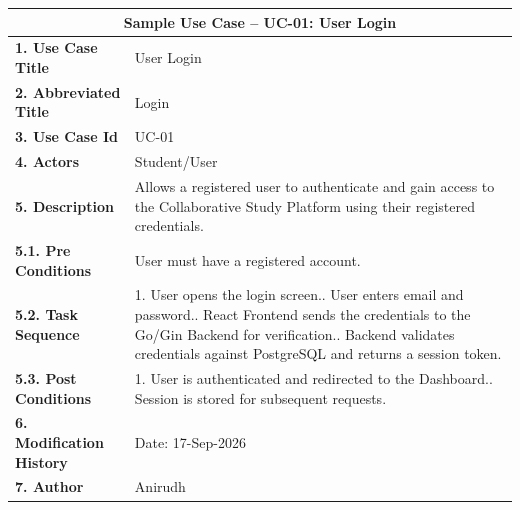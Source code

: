 \documentclass[12pt]{report}
\begin{document}
\begin{center}
\begin{longtable}{|p{4cm}|p{9cm}|}
\hline
\multicolumn{2}{|c|}{\textbf{Sample Use Case -- UC-01: User Login}} \\
\hline
\textbf{1. Use Case Title} & User Login \\
\hline
\textbf{2. Abbreviated Title} & Login \\
\hline
\textbf{3. Use Case Id} & UC-01 \\
\hline
\textbf{4. Actors} & Student/User \\
\hline
\textbf{5. Description} & Allows a registered user to authenticate and gain access to the
Collaborative Study Platform using their registered credentials. \\
\hline
\textbf{5.1. Pre Conditions} & User must have a registered account. \\
\hline
\textbf{5.2. Task Sequence} &
1. User opens the login screen.\newline
2. User enters email and password.\newline
3. React Frontend sends the credentials to the Go/Gin Backend for verification.\newline
4. Backend validates credentials against PostgreSQL and returns a session token. \\
\hline
\textbf{5.3. Post Conditions} &
1. User is authenticated and redirected to the Dashboard.\newline
2. Session is stored for subsequent requests. \\
\hline
\textbf{6. Modification History} & Date: 17-Sep-2026 \\
\hline
\textbf{7. Author} & Anirudh \\
\hline
\end{longtable}
\end{center}
\end{document}
